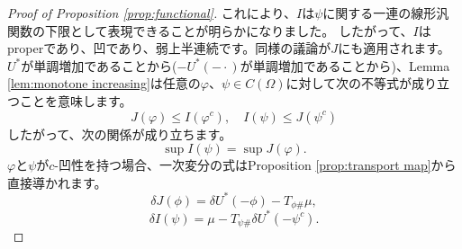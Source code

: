 \documentclass{jsarticle}
\theoremstyle{definition}
\begin{document}
\begin{proof}[Proof of Proposition \ref{prop:functional}]
    これにより、$I$は$\psi$に関する一連の線形汎関数の下限として表現できることが明らかになりました。
    {\color{teal}
    したがって、$I$はproperであり、凹であり、弱上半連続です。同様の議論が$J$にも適用されます。
    $U^*$が単調増加であることから($-U^*(- \cdot)$が単調増加であることから)、Lemma \ref{lem:monotone increasing}は任意の$\varphi$、$\psi \in C(\Omega)$に対して次の不等式が成り立つことを意味します。
    \[
        J(\varphi) \leq I(\varphi^c), \quad I(\psi) \leq J(\psi^c)
    \]
    したがって、次の関係が成り立ちます。
    \[
        \sup I(\psi) = \sup J(\varphi).
    \]
    }
    $\varphi$と$\psi$が$c$-凹性を持つ場合、一次変分の式はProposition \ref{prop:transport map}から直接導かれます。
    \begin{equation*}
        \delta J(\phi) = \delta U^*(- \phi) - T_{\phi \#} \mu,
    \end{equation*}
    \begin{equation*}
        \delta I(\psi) = \mu - T_{\psi \#} \delta U^* (- \psi^c).
    \end{equation*}


\end{proof}
\end{document}
